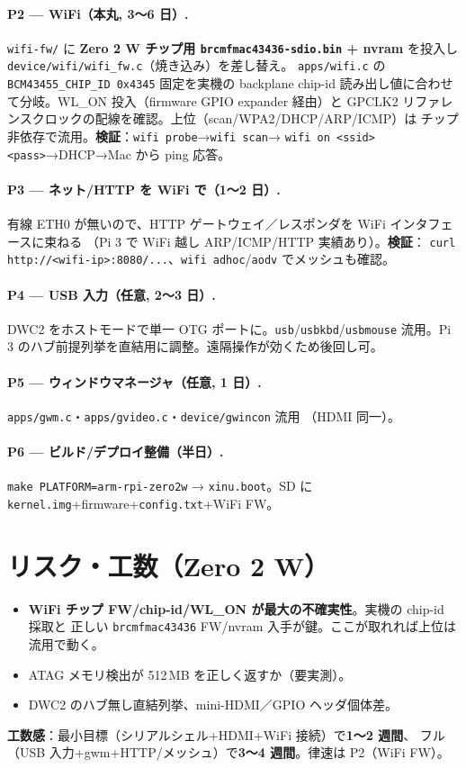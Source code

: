 \documentclass[a4paper,11pt]{ltjsarticle}
\newcommand{\cmd}[1]{\texttt{#1}}
\begin{document}
\paragraph{P2 — WiFi（本丸, 3〜6 日）.}
\texttt{wifi-fw/} に \textbf{Zero 2 W チップ用 \texttt{brcmfmac43436-sdio.bin} +
nvram} を投入し \texttt{device/wifi/wifi\_fw.c}（焼き込み）を差し替え。
\texttt{apps/wifi.c} の \texttt{BCM43455\_CHIP\_ID 0x4345} 固定を実機の
backplane chip-id 読み出し値に合わせて分岐。WL\_ON 投入（firmware GPIO expander 経由）と
GPCLK2 リファレンスクロックの配線を確認。上位（scan/WPA2/DHCP/ARP/ICMP）は
チップ非依存で流用。\textbf{検証}：\cmd{wifi probe}→\cmd{wifi scan}→%
\cmd{wifi on <ssid> <pass>}→DHCP→Mac から ping 応答。

\paragraph{P3 — ネット/HTTP を WiFi で（1〜2 日）.}
有線 ETH0 が無いので、HTTP ゲートウェイ／レスポンダを WiFi インタフェースに束ねる
（Pi 3 で WiFi 越し ARP/ICMP/HTTP 実績あり）。\textbf{検証}：%
\cmd{curl http://<wifi-ip>:8080/...}、\cmd{wifi adhoc}/\cmd{aodv} でメッシュも確認。

\paragraph{P4 — USB 入力（任意, 2〜3 日）.}
DWC2 をホストモードで単一 OTG ポートに。\texttt{usb}/\texttt{usbkbd}/\texttt{usbmouse}
流用。Pi 3 のハブ前提列挙を直結用に調整。遠隔操作が効くため後回し可。

\paragraph{P5 — ウィンドウマネージャ（任意, 1 日）.}
\texttt{apps/gwm.c}・\texttt{apps/gvideo.c}・\texttt{device/gwincon} 流用
（HDMI 同一）。

\paragraph{P6 — ビルド/デプロイ整備（半日）.}
\cmd{make PLATFORM=arm-rpi-zero2w} → \texttt{xinu.boot}。SD に
\texttt{kernel.img}+firmware+\texttt{config.txt}+WiFi FW。

\section{リスク・工数（Zero 2 W）}
\begin{itemize}[noitemsep]
  \item \textbf{WiFi チップ FW/chip-id/WL\_ON が最大の不確実性}。実機の chip-id 採取と
        正しい \texttt{brcmfmac43436} FW/nvram 入手が鍵。ここが取れれば上位は流用で動く。
  \item ATAG メモリ検出が 512\,MB を正しく返すか（要実測）。
  \item DWC2 のハブ無し直結列挙、mini-HDMI／GPIO ヘッダ個体差。
\end{itemize}
\textbf{工数感}：最小目標（シリアルシェル+HDMI+WiFi 接続）で\textbf{1〜2 週間}、
フル（USB 入力+gwm+HTTP/メッシュ）で\textbf{3〜4 週間}。律速は P2（WiFi FW）。
\end{document}
